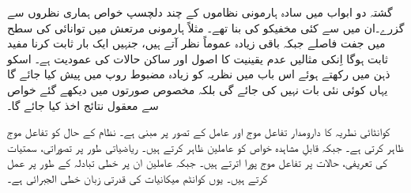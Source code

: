 	گشتہ دو ابواب میں سادہ ہارمونی نظاموں کے چند دلچسپ خواص ہماری نظروں سے گزرے۔ان میں سے کئی مخفیکو کی بنا تھے۔ مثلاً ہارمونی مرتعش میں توانائی کی سطح میں جفت فاصلے جبکہ باقی زیادہ عموماً نظر آتے ہیں، جنہیں ایک بار ثابت کرنا مفید ثابت ہوگا اِنکی مثالیں عدم یقینیت کا اصول اور ساکن حالات کی عمودیت ہے۔ اسکو ذہن میں رکھتے ہوئے اس باب میں نظریہ کو زیادہ مضبوط روپ میں پیش کیا جائے گا یہاں کوئی نئی بات نہیں کی جائے گی بلکہ مخصوص صورتوں میں دیکھے گئے خواص سے معقول نتائج اخذ کیا جائے گا۔
	
	کوانٹائی نطریہ کا دارومدار تفاعل موج اور عامل کے تصور پر مبنی ہے۔ نظام کے حال کو تفاعل موج ظاہر کرتی ہے۔ جبکہ قابلِ مشاہدہ خواص کو عاملین ظاہر کرتے ہیں۔ ریاضیاتی طور پر تصوراتی، سمتیات کی تعریفی، حالات پر تفاعل موج پورا اترتے ہیں۔ جبکہ عاملین ان پر خطی تبادلہ کے طور پر عمل کرتے ہیں۔ یوں کوانٹم میکانیات کی قدرتی زبان خطی الجبرائی ہے۔
	
